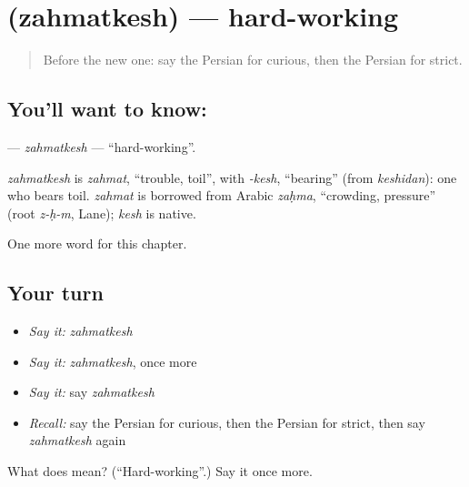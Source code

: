 \section[\texorpdfstring{\fa{زحمتکش} (zahmatkesh)}{زحمتکش (zahmatkesh)}]{ (zahmatkesh) — hard-working}

\label{lesson:FA-C238-zahmatkesh}



\begin{quote}
Before the new one: say the Persian for curious, then the Persian for strict.
\end{quote}

\subsection*{You'll want to know: }
\textbf{} — \emph{zahmatkesh} — \textquotedblleft{}hard-working\textquotedblright{}.

\begin{cousinweb}
\emph{zahmatkesh} is \emph{zahmat}, \textquotedblleft{}trouble, toil\textquotedblright{}, with \emph{-kesh}, \textquotedblleft{}bearing\textquotedblright{} (from \emph{keshidan}): one who bears toil. \emph{zahmat} is borrowed from Arabic \emph{zaḥma}, \textquotedblleft{}crowding, pressure\textquotedblright{} (root \emph{z-ḥ-m}, Lane); \emph{kesh} is native.
\end{cousinweb}

\begin{grammarlens}[title={What you've built}]
One more word for this chapter.
\end{grammarlens}

\subsection*{Your turn}
\begin{itemize}
\raggedright
  \item \emph{Say it:} \emph{zahmatkesh}
  \item \emph{Say it:} \emph{zahmatkesh}, once more
  \item \emph{Say it:} say \emph{zahmatkesh}
  \item \emph{Recall:} say the Persian for curious, then the Persian for strict, then say \emph{zahmatkesh} again
\end{itemize}

\begin{tcolorbox}[breakable,colback=teal!4,colframe=teal!35!black,title={Before you move on}]
What does  mean? (\textquotedblleft{}Hard-working\textquotedblright{}.) Say it once more.
\end{tcolorbox}
